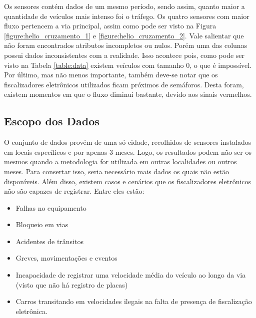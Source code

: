 Os sensores contém dados de um mesmo período, sendo assim, quanto maior a quantidade de veículos mais intenso foi o tráfego. Os quatro sensores com maior fluxo pertencem a via principal, assim como pode ser visto na Figura \ref{figure:helio_cruzamento_1} e \ref{figure:helio_cruzamento_2}. Vale salientar que não foram encontrados atributos incompletos ou nulos. Porém uma das colunas possui dados inconsistentes com a realidade. Isso acontece pois, como pode ser visto na Tabela \ref{table:data} existem veículos com tamanho 0, o que é impossível. Por último, mas não menos importante, também deve-se notar que os fiscalizadores eletrônicos utilizados ficam próximos de semáforos. Desta foram, existem momentos em que o fluxo diminui bastante, devido aos sinais vermelhos. 

\subsection{Escopo dos Dados}

O conjunto de dados provém de uma só cidade, recolhidos de sensores instalados em locais específicos e por apenas 3 meses. Logo, os resultados podem não ser os mesmos quando a metodologia for utilizada em outras localidades ou outros meses. Para consertar isso, seria necessário mais dados os quais não estão disponíveis. Além disso, existem casos e cenários que os fiscalizadores eletrônicos não são capazes de registrar. Entre eles estão:

\begin{itemize}
    \item Falhas no equipamento
    \item Bloqueio em vias
    \item Acidentes de trânsitos
    \item Greves, movimentações e eventos
    \item Incapacidade de registrar uma velocidade média do veículo ao longo da via (visto que não há registro de placas)
    \item Carros transitando em velocidades ilegais na falta de presença de fiscalização eletrônica.
\end{itemize}